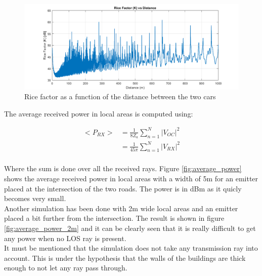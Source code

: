 \documentclass[10pt,a4paper]{ULBreport}
\begin{document}
\begin{figure}[H]
    \centering
    \includegraphics[width=1\textwidth]{3_4.png}
    \caption{Rice factor as a function of the distance between the two cars}
    \label{fig:K(d)}
\end{figure}

The average received power in local areas is computed using:

\begin{align*}
    <P_{RX}> &= \frac{1}{8 Z_a} \sum_{n=1}^{N} \left| V_{OC} \right|^2\\
    &= \frac{1}{45\pi} \sum_{n=1}^{N} \left| V_{RX} \right|^2\\
\end{align*}

Where the sum is done over all the received rays. Figure \ref{fig:average_power} shows the average received power in local areas with a width of 5m for an emitter placed at the intersection of the two roads. The power is in dBm as it quicly becomes very small. \\
Another simulation has been done with 2m wide local areas and an emitter placed a bit further from the intersection. The result is shown in figure \ref{fig:average_power_2m} and it can be clearly seen that it is really difficult to get any power when no LOS ray is present. \\
It must be mentioned that the simulation does not take any transmission ray into account. This is under the hypothesis that the walls of the buildings are thick enough to not let any ray pass through.
\end{document}

